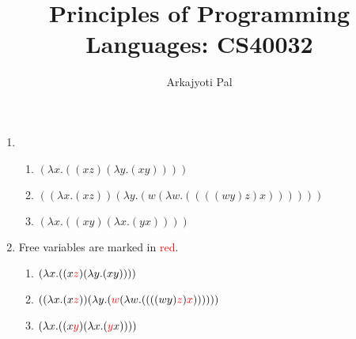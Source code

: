 \documentclass[11pt]{article}
\begin{document}
\author{Arkajyoti Pal}
\title{Principles of Programming Languages: CS40032}
\maketitle

\medskip


\begin{enumerate}
    \item \begin{enumerate}
        \item  $(\lambda x.((x z) (\lambda y.(x y))))$
        \item $((\lambda x.(x z)) ( \lambda y.(w (\lambda w.((((w y) z) x))))))$
        \item $(\lambda x.((x y) (\lambda x.(y x))))$
    \end{enumerate}
    \item Free variables are marked in \textcolor{red}{red}.
    \begin{enumerate}
        \item $(\lambda x.((x \textcolor{red}{z}) (\lambda y.(x y))))$
        \item $((\lambda x.(x \textcolor{red}{z})) (\lambda y.(\textcolor{red}{w} (\lambda w.((((w y) \textcolor{red}{z}) \textcolor{red}{x}))))))$
        \item $(\lambda x.((x \textcolor{red}{y}) (\lambda x.(\textcolor{red}{y} x))))$
    \end{enumerate}
    

\end{enumerate}
\end{document}
